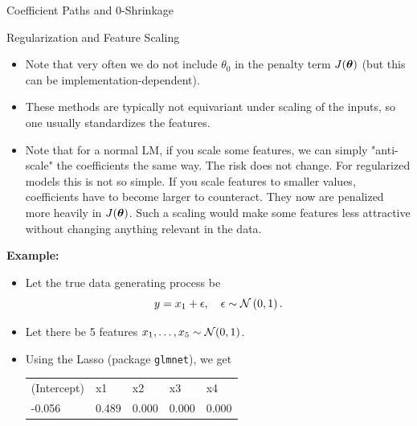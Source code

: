 \begin{vbframe}{Coefficient Paths and 0-Shrinkage}
\end{vbframe}

\begin{vbframe}{Regularization and Feature Scaling}

  \begin{itemize}
    \item Note that very often we do not include $\theta_0$ in the penalty term $J(\bm{\theta})$ (but this can be implementation-dependent).
    \item These methods are typically not equivariant under scaling of the inputs, so one usually standardizes the features.
    \item Note that for a normal LM, if you scale some features, we can simply "anti-scale" the coefficients the same way. The risk does not change. For regularized models this is not so simple. If you scale features to smaller values, coefficients have to become larger to counteract. They now are penalized more heavily in $J(\bm{\theta})$. Such a scaling would make some features less attractive without changing anything relevant in the data.

  \end{itemize}

\framebreak

\textbf{Example:}
\begin{itemize}
\item Let the true data generating process be
$$ y = x_1 + \epsilon, \quad \epsilon \sim \mathcal{N} \left(0, 1\right).$$
\item Let there be 5 features $x_1, \ldots, x_5 \sim \mathcal{N} (0,1)$.
\item Using the Lasso (package \texttt{glmnet}), we get
\footnotesize
\vspace{0.2cm}

\begin{table}[]
\begin{tabular}{lllll}
(Intercept) & x1    & x2    & x3    & x4    \\
-0.056      & 0.489 & 0.000 & 0.000 & 0.000
\end{tabular}
\end{table}



\end{itemize}
\end{vbframe}
